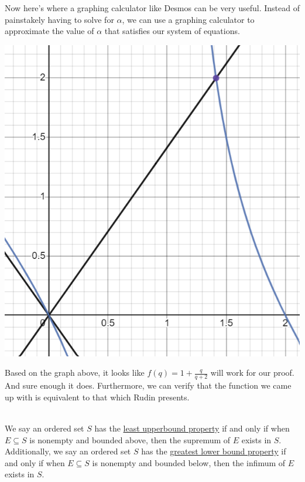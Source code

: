 \documentclass{book}
\newcommand{\hOne}{%
   \color{Black}%
   \fontsize{14}{14}\selectfont%
}
\newenvironment{myIndent}{%
   \begin{adjustwidth}{2.5em}{0em}%
}{%
   \end{adjustwidth}%
}
\newcommand{\udefine}[1]{%
   \setulcolor{Red}%
   \setul{0.1ex}{0.15ex}%
   \ul{#1}%
}
\newcommand{\mySep}[1]{%
   {\noindent\color{#1}{\rule{6.5in}{1mm}}}\\%
}
\begin{document}
\begin{itemize}
\begin{myIndent}
         Now here's where a graphing calculator like Desmos can be very
         useful. Instead of painstakely having to solve for $\alpha$,
         we can use a graphing calculator to approximate the value of
         $\alpha$ that satisfies our system of equations.
         \begin{center}
         \includegraphics[scale=0.75]{Finding_Equation_Demonstration_1.png}
         \end{center}

         Based on the graph above, it looks like $f(q) = 1 +
         \frac{q}{q + 2}$ will work for our proof. And sure enough 
         it does. Furthermore, we can verify that the function we came
         up with is equivalent to that which Rudin presents.
      \end{myIndent}
   \end{itemize}

   \mySep{Purple}
   \hOne\hfill \break
   We say an ordered set $S$ has the \udefine{least upperbound
   property} if and only if when $E \subseteq S$ is nonempty and 
   bounded above, then the supremum of $E$ exists in $S$. Additionally, 
   we say an ordered set $S$ has the \udefine{greatest lower bound 
   property} if and only if when $E \subseteq S$ is nonempty and 
   bounded below, then the infimum of $E$ exists in $S$.
   
\end{document}
